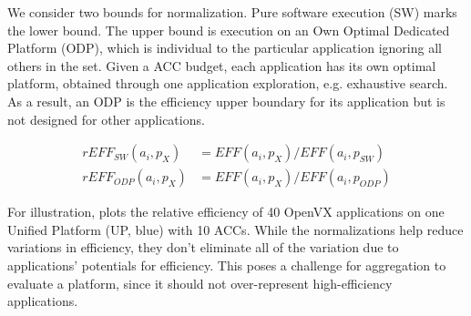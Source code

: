 We consider two bounds for normalization. Pure software execution (SW) marks the lower bound. The upper bound is execution on an Own Optimal Dedicated Platform (ODP), which is individual to the particular application ignoring all others in the set. Given a ACC budget, each application has its own optimal platform, obtained through one application exploration, e.g. exhaustive search. As a result, an ODP is the efficiency upper boundary for its application but is not designed for other applications.



\vspace{-8pt}
\begin{equation}
\begin{split}
	rEFF_{SW}(a_{i}, p_{X}) &= EFF(a_{i}, p_{X}) / EFF(a_{i}, p_{SW}) \\
	rEFF_{ODP}(a_{i}, p_{X}) &= EFF(a_{i}, p_{X}) / EFF(a_{i}, p_{ODP})
\label{eq:rel}
\end{split}
\end{equation}

For illustration,  plots the relative efficiency of 40 OpenVX applications on one Unified Platform (UP, blue) with 10 ACCs. While the normalizations help reduce variations in efficiency, they don't eliminate all of the variation due to applications' potentials for efficiency. This poses a challenge for aggregation to evaluate a platform, since it should not over-represent high-efficiency applications.

